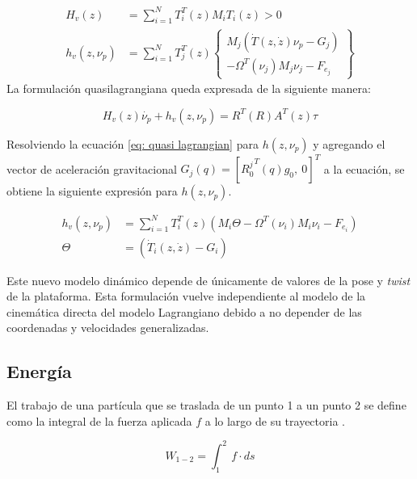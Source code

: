 \begin{subequations}
 \begin{align}
  H_v(z) &= \sum_{i=1}^N T_i^T (z) M_i T_i(z) > 0\\
  h_v (z, \nu_p) &= \sum_{i=1}^N T_j^T (z) \begin{Bmatrix}
                                          M_j (\dot T(z, \dot z)\nu_p -G_j) \\
                                          - \Omega^T (\nu_j) M_j \nu_j - F_{e_j}
                                          \end{Bmatrix}
 \end{align}
\end{subequations}
La formulación quasilagrangiana queda expresada de la 
siguiente manera:

\begin{equation}\label{eq: quasi lagrangian}
  H_v(z)\dot{\nu_p}+h_v(z,\nu_p) = R^T(R) A^T(z)\tau
\end{equation}

Resolviendo la ecuación \eqref{eq: quasi lagrangian}
para $h(z,\nu_p)$ y agregando el vector de 
aceleración gravitacional 
$G_j(q) = [{R_0^j}^T(q)g_0, \ 0 ]^T$ a la ecuación, 
se obtiene la siguiente expresión para $h(z,\nu_p)$.

\begin{subequations}
\begin{align}
 h_v(z,\nu_p) & =  \sum_{i=1}^N T_i^T(z)  \left( M_i \Theta  - \Omega^T(\nu_i)M_i\nu_i - F_{e_i} \right)\\
 \Theta & = \left(\dot T_i (z,\dot z) - G_i \right)
\end{align}
\end{subequations}

Este nuevo modelo dinámico depende de únicamente de valores de la pose y \emph{twist} de la plataforma.
Esta formulación vuelve independiente al modelo de la cinemática directa del modelo Lagrangiano debido a no depender de las coordenadas y velocidades generalizadas.

\subsection{Energía}

El trabajo de una partícula que se traslada de un punto 1 a un punto 2 se define como la integral de la fuerza aplicada $f$ a lo largo de su trayectoria \cite{olguin20183d}.

\begin{equation}\label{equ:trabajo 1}
W_{1-2} = \int_1^2 \ f \cdot ds
\end{equation}


